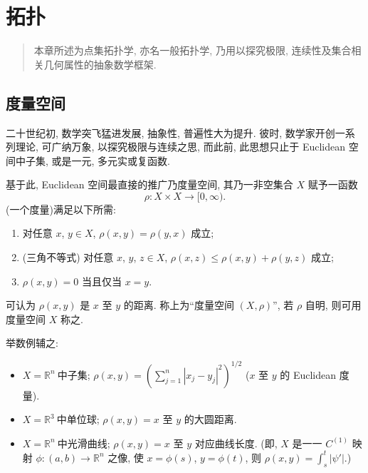 \documentclass{ARA}
\begin{document}





\makeatletter
\def\cftchapleader{~~\color{lightgray!20!white}\leavevmode\cleaders\hbox to 0.05em{\hss \rule[-0.1em]{0.1em}{0.8em}\hss }\hfill\kern0pt}
\def\cftsecleader{\hfil}
\cftsetpnumwidth{6em}
\def\cftchapindent{3em}
\def\cftsecindent{5em}
\def\cftsecaftersnumb{\itshape}
\def\cftchappagefont{\color{lightgray!20!white}\leavevmode\cleaders\hbox to 0.05em{\hss \rule[-0.1em]{0.1em}{0.8em}\hss }\hfill\kern0pt\kaishu~~\color{black}\fontspec{lmsans10-boldoblique.otf}}
\tableofcontents


\chapter{拓\kern\ccwd 扑}
\begin{quote}
    本章所述为点集拓扑学, 亦名一般拓扑学, 乃用以探究极限, 连续性及集合相关几何属性的抽象数学框架.
\end{quote}

\section{度量空间}
二十世纪初, 数学突飞猛进发展, 抽象性, 普遍性大为提升. 彼时, 数学家开创一系列理论, 可广纳万象, 以探究极限与连续之思, 而此前, 此思想只止于 Euclidean 空间中子集, 或是一元, 多元实或复函数.

基于此, Euclidean 空间最直接的推广乃度量空间, 其乃一非空集合 $X$ 赋予一函数
\[\rho :X\times X\to [0,\infty).\]
(一个度量)满足以下所需:
\begin{enumerate}
    \item 对任意 $x$, $y\in X$, $\rho (x,y)=\rho (y,x)$ 成立;
    \item (三角不等式) 对任意 $x$, $y$, $z\in X$, $\rho (x,z)\leqslant \rho (x,y)+\rho (y,z)$ 成立;
    \item $\rho (x,y)=0$ 当且仅当 $x=y$.
\end{enumerate}
可认为 $\rho (x,y)$ 是 $x$ 至 $y$ 的距离. 称上为``度量空间 $(X,\rho)$'', 若 $\rho $ 自明, 则可用度量空间 $X$ 称之.

举数例辅之:
\begin{itemize}
    \item $X=\mathbb R^n~\textit{中子集}$; $\rho (x,y) = (\sum_{j=1}^n|x_j-y_j|^2)^{1 /2}$ ($x$ 至 $y$ 的 Euclidean 度量).
    \item $X=\mathbb R^3~\textit{中单位球}$; $\rho (x,y) = \text{$x$ 至 $y$ 的大圆距离}$.
    \item $X=\mathbb R^n~\textit{中光滑曲线}$; $\rho (x,y) = \text{$x$ 至 $y$ 对应曲线长度}$. (即, $X$ 是一一 $C^{(1)}$ 映射 $\phi :(a,b)\to \mathbb R^n$ 之像, 使 $x=\phi (s)$, $y=\phi (t)$, 则 $\rho (x,y)=\int_s^t|\psi '|$.)
\end{itemize}




\end{document}
